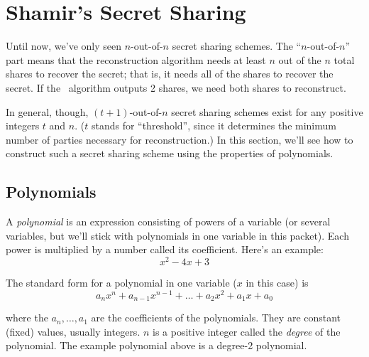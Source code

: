 \section{Shamir's Secret Sharing}

Until now, we've only seen $n$-out-of-$n$ secret sharing schemes. The ``$n$-out-of-$n$'' part means that 
the reconstruction algorithm needs at least $n$ out of the $n$ total shares to recover the
secret; that is, it needs all of the shares to recover the secret. If the 
\share~algorithm outputs 2 shares, we need both shares to reconstruct.

In general, though, $(t+1)$-out-of-$n$ secret sharing schemes exist for any positive integers
$t$ and $n$.
($t$ stands for ``threshold'', since it determines the minimum number of parties necessary 
for reconstruction.)
In this section, we'll see how to construct such a secret sharing scheme using the properties 
of polynomials.

\subsection{Polynomials}

A \emph{polynomial} is an expression consisting of powers of a variable (or several variables,
but we'll stick with polynomials in one variable in this packet). Each power 
is multiplied by a number called its coefficient. Here's an example:
\[
    x^2 - 4x + 3
\]

The standard form for a polynomial in one variable ($x$ in this case) is 
\begin{equation}\label{eqn:std-form}
    a_n x^n + a_{n-1} x^{n-1} + \ldots + a_2 x^2 + a_1 x + a_0
\end{equation}

where the $a_n, \ldots, a_1$ are the coefficients of the polynomials. They 
are constant (fixed) values, usually integers. $n$ 
is a positive integer called the \emph{degree} of the polynomial. The example polynomial
above is a degree-2 polynomial.

\begin{center}
\end{center}

